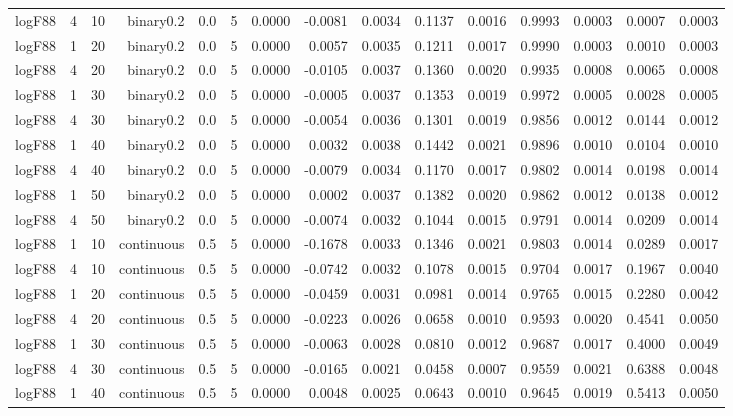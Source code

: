 \begin{longtable}{rrrrrrrrrrrrrrr}
  logF88 & 4 & 10 & binary0.2 & 0.0 & 5 & 0.0000 & -0.0081 & 0.0034 & 0.1137 & 0.0016 & 0.9993 & 0.0003 & 0.0007 & 0.0003 \\ 
  logF88 & 1 & 20 & binary0.2 & 0.0 & 5 & 0.0000 & 0.0057 & 0.0035 & 0.1211 & 0.0017 & 0.9990 & 0.0003 & 0.0010 & 0.0003 \\ 
  logF88 & 4 & 20 & binary0.2 & 0.0 & 5 & 0.0000 & -0.0105 & 0.0037 & 0.1360 & 0.0020 & 0.9935 & 0.0008 & 0.0065 & 0.0008 \\ 
  logF88 & 1 & 30 & binary0.2 & 0.0 & 5 & 0.0000 & -0.0005 & 0.0037 & 0.1353 & 0.0019 & 0.9972 & 0.0005 & 0.0028 & 0.0005 \\ 
  logF88 & 4 & 30 & binary0.2 & 0.0 & 5 & 0.0000 & -0.0054 & 0.0036 & 0.1301 & 0.0019 & 0.9856 & 0.0012 & 0.0144 & 0.0012 \\ 
  logF88 & 1 & 40 & binary0.2 & 0.0 & 5 & 0.0000 & 0.0032 & 0.0038 & 0.1442 & 0.0021 & 0.9896 & 0.0010 & 0.0104 & 0.0010 \\ 
  logF88 & 4 & 40 & binary0.2 & 0.0 & 5 & 0.0000 & -0.0079 & 0.0034 & 0.1170 & 0.0017 & 0.9802 & 0.0014 & 0.0198 & 0.0014 \\ 
  logF88 & 1 & 50 & binary0.2 & 0.0 & 5 & 0.0000 & 0.0002 & 0.0037 & 0.1382 & 0.0020 & 0.9862 & 0.0012 & 0.0138 & 0.0012 \\ 
  logF88 & 4 & 50 & binary0.2 & 0.0 & 5 & 0.0000 & -0.0074 & 0.0032 & 0.1044 & 0.0015 & 0.9791 & 0.0014 & 0.0209 & 0.0014 \\ 
  logF88 & 1 & 10 & continuous & 0.5 & 5 & 0.0000 & -0.1678 & 0.0033 & 0.1346 & 0.0021 & 0.9803 & 0.0014 & 0.0289 & 0.0017 \\ 
  logF88 & 4 & 10 & continuous & 0.5 & 5 & 0.0000 & -0.0742 & 0.0032 & 0.1078 & 0.0015 & 0.9704 & 0.0017 & 0.1967 & 0.0040 \\ 
  logF88 & 1 & 20 & continuous & 0.5 & 5 & 0.0000 & -0.0459 & 0.0031 & 0.0981 & 0.0014 & 0.9765 & 0.0015 & 0.2280 & 0.0042 \\ 
  logF88 & 4 & 20 & continuous & 0.5 & 5 & 0.0000 & -0.0223 & 0.0026 & 0.0658 & 0.0010 & 0.9593 & 0.0020 & 0.4541 & 0.0050 \\ 
  logF88 & 1 & 30 & continuous & 0.5 & 5 & 0.0000 & -0.0063 & 0.0028 & 0.0810 & 0.0012 & 0.9687 & 0.0017 & 0.4000 & 0.0049 \\ 
  logF88 & 4 & 30 & continuous & 0.5 & 5 & 0.0000 & -0.0165 & 0.0021 & 0.0458 & 0.0007 & 0.9559 & 0.0021 & 0.6388 & 0.0048 \\ 
  logF88 & 1 & 40 & continuous & 0.5 & 5 & 0.0000 & 0.0048 & 0.0025 & 0.0643 & 0.0010 & 0.9645 & 0.0019 & 0.5413 & 0.0050 \\ 

\end{longtable}
